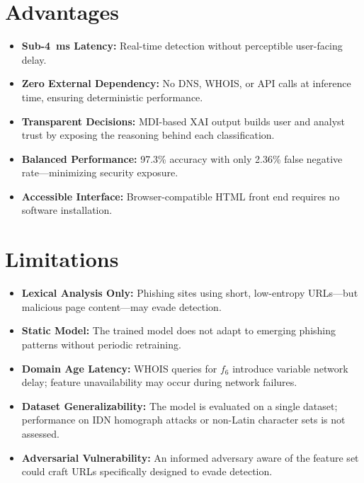 \documentclass[conference]{IEEEtran}
\begin{document}
\section{Advantages}
\label{sec:advantages}

\begin{itemize}[leftmargin=*]
    \item \textbf{Sub-4~ms Latency:} Real-time detection without 
    perceptible user-facing delay.
    \item \textbf{Zero External Dependency:} No DNS, WHOIS, or 
    API calls at inference time, ensuring deterministic performance.
    \item \textbf{Transparent Decisions:} MDI-based XAI output 
    builds user and analyst trust by exposing the reasoning 
    behind each classification.
    \item \textbf{Balanced Performance:} 97.3\% accuracy with 
    only 2.36\% false negative rate—minimizing security exposure.
    \item \textbf{Accessible Interface:} Browser-compatible HTML 
    front end requires no software installation.
\end{itemize}

\section{Limitations}
\label{sec:limitations}

\begin{itemize}[leftmargin=*]
    \item \textbf{Lexical Analysis Only:} Phishing sites using 
    short, low-entropy URLs—but malicious page content—may evade 
    detection.
    \item \textbf{Static Model:} The trained model does not 
    adapt to emerging phishing patterns without periodic 
    retraining.
    \item \textbf{Domain Age Latency:} WHOIS queries for $f_6$ 
    introduce variable network delay; feature unavailability 
    may occur during network failures.
    \item \textbf{Dataset Generalizability:} The model is 
    evaluated on a single dataset; performance on IDN homograph 
    attacks or non-Latin character sets is not assessed.
    \item \textbf{Adversarial Vulnerability:} An informed 
    adversary aware of the feature set could craft URLs 
    specifically designed to evade detection.
\end{itemize}
\end{document}
